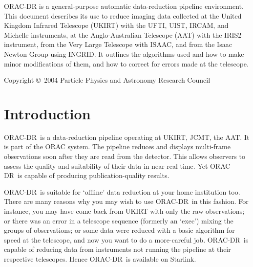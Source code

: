 \documentclass[twoside,11pt]{article}
\newcommand{\stardocinitials}  {SUN}
\newcommand{\stardocnumber}    {232.8}
\newcommand{\stardoccopyright} {Copyright \copyright\ 2004 Particle Physics and Astronomy Research Council}
\newcommand{\stardocabstract}  {{\footnotesize ORAC-DR} is a
general-purpose automatic data-reduction pipeline environment.  This
document describes its use to reduce imaging data collected at the
United Kingdom Infrared Telescope (UKIRT) with the UFTI, UIST, IRCAM,
and Michelle instruments, at the Anglo-Australian Telescope (AAT) with
the IRIS2 instrument, from the Very Large Telescope with ISAAC, and
from the Isaac Newton Group using INGRID.  It outlines the algorithms
used and how to make minor modifications of them, and how to correct
for errors made at the telescope.}
\newcommand{\stardocname}{\stardocinitials /\stardocnumber}
\newcommand{\htmladdnormallink}[2]{#1}
\newenvironment{latexonly}{}{}
\newcommand{\xlabel}[1]{}
\renewcommand{\_}{\texttt{\symbol{95}}}
\newcommand{\ORACDR}{{\footnotesize ORAC-DR}}
\newcommand{\AAT}{\htmladdnormallink{AAT}{http://www.aao.gov.au/}}
\newcommand{\JCMT}{\htmladdnormallink{JCMT}{http://www.jach.hawaii.edu/JACpublic/JCMT/}}
\newcommand{\UKIRT}{\htmladdnormallink{UKIRT}{http://www.jach.hawaii.edu/JACpublic/UKIRT/}}
\renewcommand{\thepage}{\roman{page}}
\begin{document}
\stardocabstract

\begin{latexonly}
\newpage
\vspace*{\fill}
\stardoccopyright
\end{latexonly}

  \newpage
  \begin{latexonly}
    \setlength{\parskip}{0mm}
    \tableofcontents
    \setlength{\parskip}{\medskipamount}
    \markboth{\stardocname}{\stardocname}
  \end{latexonly}
\cleardoublepage
\renewcommand{\thepage}{\arabic{page}}
\setcounter{page}{1}

\section{\xlabel{introduction}Introduction\label{introduction}}

\ORACDR\ is a data-reduction pipeline operating at \UKIRT, \JCMT,
the \AAT.  It is part of the
\htmladdnormallink{ORAC system}{http://www.stsci.edu/stsci/meetings/adassVII/bridgera.html}.
The pipeline reduces and displays multi-frame
observations soon after they are read from the detector.  This allows
observers to assess the quality and suitability of their data in near
real time.  Yet \ORACDR\ is capable of producing publication-quality
results.  

\ORACDR\ is suitable for `offline' data reduction at your home
institution too.  There are many reasons why you may wish to use
\ORACDR\ in this fashion.  For instance, you may have come back from
UKIRT with only the raw observations; or there was an error in a
telescope sequence (formerly an `exec') mixing the groups of
observations; or some data were reduced with a basic algorithm for
speed at the telescope, and now you want to do a more-careful job.
\ORACDR\ is capable of reducing data from instruments not running the
pipeline at their respective telescopes.  Hence \ORACDR\ is available
on Starlink.
\end{document}
